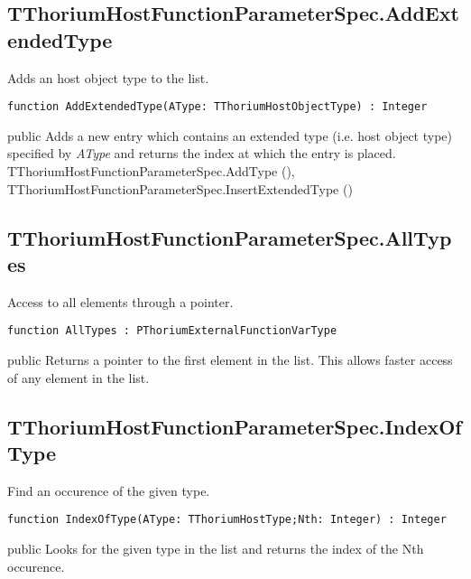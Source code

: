 \subsection{TThoriumHostFunctionParameterSpec.AddExtendedType}
\label{thoriumcorepkg:thorium:tthoriumhostfunctionparameterspec:addextendedtype}
\begin{FPCList}
\Synopsis
Adds an host object type to the list.\Declaration 

\begin{verbatim}
function AddExtendedType(AType: TThoriumHostObjectType) : Integer
\end{verbatim}
\Visibility
public
\Description
Adds a new entry which contains an extended type (i.e. host object type) specified by \textit{AType} and returns the index at which the entry is placed.\SeeAlso
TThoriumHostFunctionParameterSpec.AddType (\pageref{thoriumcorepkg:thorium:tthoriumhostfunctionparameterspec:addtype}),
TThoriumHostFunctionParameterSpec.InsertExtendedType (\pageref{thoriumcorepkg:thorium:tthoriumhostfunctionparameterspec:insertextendedtype})\end{FPCList}
\subsection{TThoriumHostFunctionParameterSpec.AllTypes}
\label{thoriumcorepkg:thorium:tthoriumhostfunctionparameterspec:alltypes}
\begin{FPCList}
\Synopsis
Access to all elements through a pointer.\Declaration 

\begin{verbatim}
function AllTypes : PThoriumExternalFunctionVarType
\end{verbatim}
\Visibility
public
\Description
Returns a pointer to the first element in the list. This allows faster access of any element in the list.\end{FPCList}
\subsection{TThoriumHostFunctionParameterSpec.IndexOfType}
\label{thoriumcorepkg:thorium:tthoriumhostfunctionparameterspec:indexoftype}
\begin{FPCList}
\Synopsis
Find an occurence of the given type.\Declaration 

\begin{verbatim}
function IndexOfType(AType: TThoriumHostType;Nth: Integer) : Integer
\end{verbatim}
\Visibility
public
\Description
Looks for the given type in the list and returns the index of the Nth occurence.\end{FPCList}
